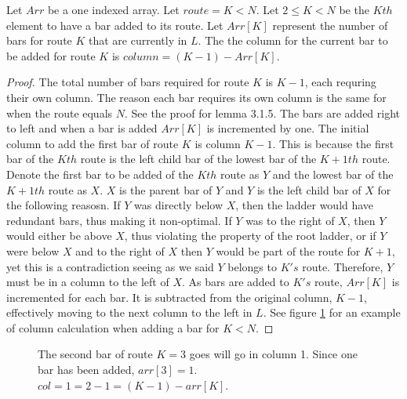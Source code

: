 \begin{lemma}
  Let $Arr$ be a one indexed array. Let $route=K<N$. Let $2 \leq K < N$ be the $Kth$ element to have a bar added to its route. 
  Let $Arr[K]$ represent the number of bars for route $K$ that are currently in $L$. 
  The the column for the current bar to be added for route $K$ is $column=(K-1)-Arr[K]$.
\end{lemma}
\begin{proof}
  The total number of bars required for route $K$ is $K-1$, each requring their own column. The reason each 
  bar requires its own column is the same for when the route equals $N$. See the proof for lemma 3.1.5. The 
  bars are added right to left and when a bar is added $Arr[K]$ is incremented by one. The initial column to add the first bar 
  of route $K$ is column $K-1$. This is because the first bar of the $Kth$ route is the left child bar of the 
  lowest bar of the $K+1th$ route. Denote the first bar to be added of the $Kth$ route as $Y$ and the 
  lowest bar of the $K+1th$ route as $X$. $X$ is the parent bar of $Y$ and $Y$ is the left child bar of 
  $X$ for the following reasosn. If $Y$ was directly below $X$, then the ladder would have redundant bars, thus making it 
  non-optimal. If $Y$ was to the right of $X$, then $Y$ would either be above $X$, thus violating the property of the root ladder, 
  or if $Y$ were below $X$ and to the right of $X$ then $Y$ would be part of the route for $K+1$, yet this is a contradiction 
  seeing as we said $Y$ belongs to $K's$ route. Therefore, $Y$ must be in a column to the left of $X$. As bars are added 
  to $K's$ route, $Arr[K]$ is incremented for each bar. It is subtracted from the original column, $K-1$, effectively moving 
  to the next column to the left in $L$. See figure \ref{Fig:SJTcase6} for an example of column calculation when adding a bar for $K<N$.
\end{proof}
\begin{figure}[!htp]
  \begin{center}
    
\end{center} 
\caption{The second bar of route $K=3$ goes will go in column 1. Since one bar has been added, $arr[3]=1$. $col=1=2-1=(K-1)-arr[K]$.}

\label{Fig:SJTcase6}
\end{figure}

